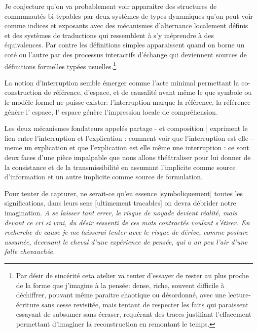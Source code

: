\documentclass{article}
\begin{document}
Je conjecture qu'on va probablement  voir apparaitre des structures de communautés bi-typables par deux systèmes de types dynamiques qu'on peut voir comme indices et exposants avec des mécanismes d'alternance localement définis et des systèmes de traductions qui ressemblent à s'y méprendre à des équivalences. Par contre les définitions simples apparaissent quand on borne un coté ou l'autre par des processus interactifs d'échange qui deviennent sources de définitions formelles typées usuelles.\footnote{Par désir de sincérité ceta atelier va tenter d'essayer de rester au plus proche de la forme que j'imagine à la pensée: dense, riche, souvent difficile à déchiffrer, pouvant même paraitre chaotique ou désordonné, avec une lecture-écriture sans cesse revisitée, mais tentant de respecter les faits qui paraissent essayant de  subsumer sans écraser, requérant des traces justifiant l'effacement permettant d'imaginer la reconstruction en remontant le temps.}

La notion d'interruption semble émerger comme l'acte  minimal permettant la  co-construction de référence, d'espace, et de causalité avant même le que symbole ou le modèle   formel ne puisse exister: l'interruption marque la  référence, la référence génère l' espace, l' espace  génère l'impression locale de  compréhension. 

Les deux mécanismes fondateurs appelés partage  - et composition | expriment le lien entre l'interruption et l'explication : comment voir que l'interruption est elle -meme un explication et que l'explication est elle même une interruption : ce sont deux faces d'une pièce impalpable que nous allons théâtraliser pour lui donner de la consistance et de la transmissibilité en assumant l'implicite comme source d'information et un autre implicite comme source de formulation.

Pour tenter de capturer, ne serait-ce qu'en essence [symboliquement] toutes les significations, dans leurs sens [ultimement tracables] on devra débrider notre imagination.
 \emph{ A se laisser tant errer, le risque de noyade devient réalité, mais devant 
 ce cri si vrai,  du désir ressenti de ces mots contractés voulant s'étirer. En recherche de cause je me laisserai tenter avec le risque de dérive, comme posture assumée, devenant le cheval d'une expérience de pensée, qui a un peu l'air d'une folle chevauchée.}%
\end{document}
